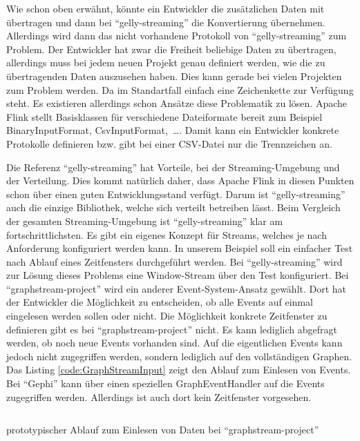 Wie schon oben erwähnt, könnte ein Entwickler die zusätzlichen Daten mit
übertragen und dann bei \enquote{gelly-streaming} die Konvertierung übernehmen.
Allerdings wird dann das nicht vorhandene Protokoll von \enquote{gelly-streaming}
zum Problem. Der Entwickler hat zwar die Freiheit beliebige Daten zu übertragen,
allerdings muss bei jedem neuen Projekt genau definiert werden, wie die zu
übertragenden Daten auszusehen haben. Dies kann gerade bei vielen Projekten zum
Problem werden. Da im Standartfall einfach eine Zeichenkette zur Verfügung steht.
Es existieren allerdings schon Ansätze diese Problematik zu lösen. Apache Flink
stellt Basisklassen für verschiedene Dateiformate bereit zum Beispiel
BinaryInputFormat, CsvInputFormat,~\dots . Damit kann ein Entwickler konkrete
Protokolle definieren bzw. gibt bei einer CSV-Datei nur die Trennzeichen an.

Die Referenz \enquote{gelly-streaming} hat Vorteile, bei der Streaming-Umgebung
und der Verteilung. Dies kommt natürlich daher, dass Apache Flink in diesen
Punkten schon über einen guten Entwicklungsstand verfügt. Darum ist
\enquote{gelly-streaming} auch die einzige Bibliothek, welche sich verteilt
betreiben lässt. Beim Vergleich der gesamten Streaming-Umgebung ist
\enquote{gelly-streaming} klar am fortschrittlichsten. Es gibt ein eigenes
Konzept für Streams, welches je nach Anforderung konfiguriert werden kann. In
unserem Beispiel soll ein einfacher Test nach Ablauf eines Zeitfensters
durchgeführt werden. Bei \enquote{gelly-streaming} wird zur Lösung dieses
Problems eine Window-Stream über den Test konfiguriert. Bei \enquote{graphstream-project}
wird ein anderer Event-System-Ansatz gewählt. Dort hat der Entwickler die
Möglichkeit zu entscheiden, ob alle Events auf einmal eingelesen werden sollen
oder nicht. Die Möglichkeit konkrete Zeitfenster zu definieren gibt es bei
\enquote{graphstream-project} nicht. Es kann lediglich abgefragt werden, ob noch
neue Events vorhanden sind. Auf die eigentlichen Events kann jedoch nicht
zugegriffen werden, sondern lediglich auf den vollständigen Graphen. Das Listing
\ref{code:GraphStreamInput} zeigt den Ablauf zum Einlesen von Events. Bei \enquote{Gephi}
kann über einen speziellen GraphEventHandler auf die Events zugegriffen werden.
Allerdings ist auch dort kein Zeitfenster vorgesehen.

\begin{listing}
    \inputminted[breaklines=true]{java}{../material/code/GraphStreamInput.java}
    \caption{prototypischer Ablauf zum Einlesen von Daten bei \enquote{graphstream-project}}
    \label{code:GraphStreamInput}
\end{listing}

